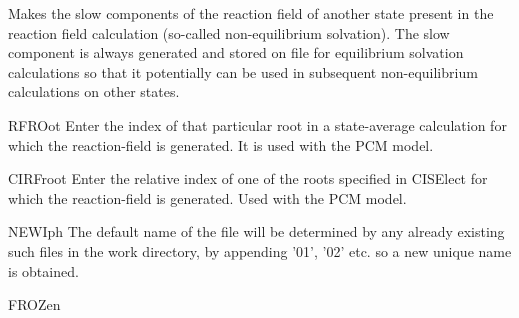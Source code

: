 \begin{keywordlist}
Makes the slow components of the reaction field of another state present in the
reaction field calculation (so-called non-equilibrium solvation). The slow component
is always generated and stored on file for equilibrium solvation calculations so that
it potentially can be used in subsequent non-equilibrium calculations on other states.
\item[RFROot]
Enter the index of that particular root in a state-average
calculation for which the reaction-field is generated. It is used with the PCM model.
\item[CIRFroot]
Enter the relative index of one of the roots specified in CISElect
for which the reaction-field is generated. Used with the PCM model.
\item[NEWIph]
The default name of the  file will be determined by any already existing such files
in the work directory, by appending '01', '02' etc. so a new unique name is
obtained.
\item[FROZen]

\end{keywordlist}
